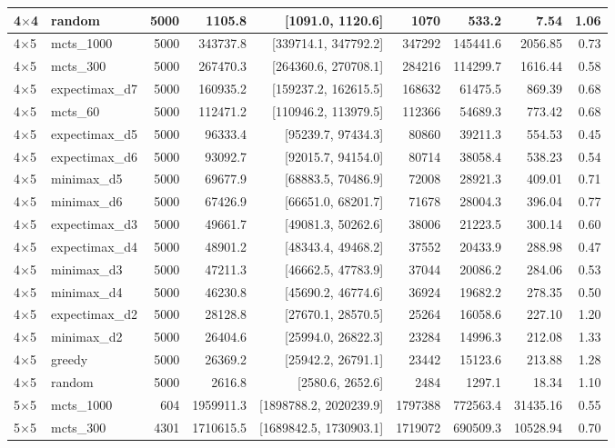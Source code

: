 {\begin{longtable}{llrrrrrrr}
4$\times$4 & random & 5000 & 1105.8 & [1091.0, 1120.6] & 1070 & 533.2 & 7.54 & 1.06 \\
\midrule
4$\times$5 & mcts\_1000 & 5000 & 343737.8 & [339714.1, 347792.2] & 347292 & 145441.6 & 2056.85 & 0.73 \\
4$\times$5 & mcts\_300 & 5000 & 267470.3 & [264360.6, 270708.1] & 284216 & 114299.7 & 1616.44 & 0.58 \\
4$\times$5 & expectimax\_d7 & 5000 & 160935.2 & [159237.2, 162615.5] & 168632 & 61475.5 & 869.39 & 0.68 \\
4$\times$5 & mcts\_60 & 5000 & 112471.2 & [110946.2, 113979.5] & 112366 & 54689.3 & 773.42 & 0.68 \\
4$\times$5 & expectimax\_d5 & 5000 & 96333.4 & [95239.7, 97434.3] & 80860 & 39211.3 & 554.53 & 0.45 \\
4$\times$5 & expectimax\_d6 & 5000 & 93092.7 & [92015.7, 94154.0] & 80714 & 38058.4 & 538.23 & 0.54 \\
4$\times$5 & minimax\_d5 & 5000 & 69677.9 & [68883.5, 70486.9] & 72008 & 28921.3 & 409.01 & 0.71 \\
4$\times$5 & minimax\_d6 & 5000 & 67426.9 & [66651.0, 68201.7] & 71678 & 28004.3 & 396.04 & 0.77 \\
4$\times$5 & expectimax\_d3 & 5000 & 49661.7 & [49081.3, 50262.6] & 38006 & 21223.5 & 300.14 & 0.60 \\
4$\times$5 & expectimax\_d4 & 5000 & 48901.2 & [48343.4, 49468.2] & 37552 & 20433.9 & 288.98 & 0.47 \\
4$\times$5 & minimax\_d3 & 5000 & 47211.3 & [46662.5, 47783.9] & 37044 & 20086.2 & 284.06 & 0.53 \\
4$\times$5 & minimax\_d4 & 5000 & 46230.8 & [45690.2, 46774.6] & 36924 & 19682.2 & 278.35 & 0.50 \\
4$\times$5 & expectimax\_d2 & 5000 & 28128.8 & [27670.1, 28570.5] & 25264 & 16058.6 & 227.10 & 1.20 \\
4$\times$5 & minimax\_d2 & 5000 & 26404.6 & [25994.0, 26822.3] & 23284 & 14996.3 & 212.08 & 1.33 \\
4$\times$5 & greedy & 5000 & 26369.2 & [25942.2, 26791.1] & 23442 & 15123.6 & 213.88 & 1.28 \\
4$\times$5 & random & 5000 & 2616.8 & [2580.6, 2652.6] & 2484 & 1297.1 & 18.34 & 1.10 \\
\midrule
5$\times$5 & mcts\_1000 & 604 & 1959911.3 & [1898788.2, 2020239.9] & 1797388 & 772563.4 & 31435.16 & 0.55 \\
5$\times$5 & mcts\_300 & 4301 & 1710615.5 & [1689842.5, 1730903.1] & 1719072 & 690509.3 & 10528.94 & 0.70 \\

\end{longtable}}
